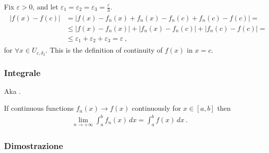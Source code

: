 \documentclass[letterpaper,10pt,italian]{jupyterBook}
\begin{document}
\sphinxAtStartPar
Fix \(\varepsilon > 0\), and let \(\varepsilon_1 = \varepsilon_2 = \varepsilon_3 = \frac{\varepsilon}{3}\).
\begin{equation*}
\begin{split}\begin{aligned}
  | f(x) - f(c) |
  & = | f(x) - f_n(x) + f_n(x) - f_n(c) + f_n(c) - f(c)| = \\
  & \le | f(x) - f_n(x) | + | f_n(x) - f_n(c) | + | f_n(c) - f(c)| = \\
  & \le \varepsilon_1 + \varepsilon_2 + \varepsilon_3  = \varepsilon \ ,
\end{aligned}\end{split}
\end{equation*}
\sphinxAtStartPar
for \(\forall x \in U_{c,\delta_2}\). This is the definition of continuity of \(f(x)\) in \(x = c\).


\subsubsection{Integrale}
\label{\detokenize{ch/series/series-functions-real:integrale}}
\sphinxAtStartPar
Aka .

\sphinxAtStartPar
If continuous functions \(f_n(x) \rightarrow f(x)\) continuously for \(x \in [a,b]\) then
\begin{equation*}
\begin{split}\lim_{n\rightarrow +\infty} \int_{a}^{b} f_n(x) \, dx = \int_{a}^{b} f(x) \, dx \ .\end{split}
\end{equation*}\subsubsection*{Dimostrazione}
\end{document}
